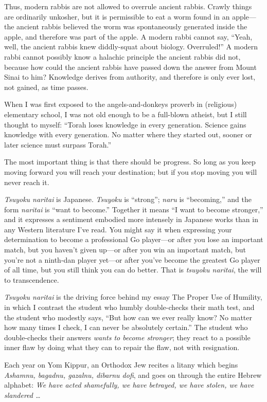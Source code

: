 {
 Thus, modern rabbis are not allowed to overrule ancient rabbis.
Crawly things are ordinarily unkosher, but it is permissible to eat a
worm found in an apple---the ancient rabbis believed the worm was
spontaneously generated inside the apple, and therefore was part of the
apple. A modern rabbi cannot say, ``Yeah, well, the
ancient rabbis knew diddly-squat about biology.
Overruled!'' A modern rabbi cannot possibly know a
halachic principle the ancient rabbis did not, because how could the
ancient rabbis have passed down the answer from Mount Sinai to him?
Knowledge derives from authority, and therefore is only ever lost, not
gained, as time passes.}

{
 When I was first exposed to the angels-and-donkeys proverb in
(religious) elementary school, I was not old enough to be a full-blown
atheist, but I still thought to myself: ``Torah loses
knowledge in every generation. Science gains knowledge with every
generation. No matter where they started out, sooner or later science
must surpass Torah.''}

{
 The most important thing is that there should be progress. So long
as you keep moving forward you will reach your destination; but if you
stop moving you will never reach it.}

{
 \textit{Tsuyoku naritai} is Japanese. \textit{Tsuyoku} is
``strong''; \textit{naru} is
``becoming,'' and the form
\textit{naritai} is ``want to
become.'' Together it means ``I want
to become stronger,'' and it expresses a sentiment
embodied more intensely in Japanese works than in any Western
literature I've read. You might say it when expressing
your determination to become a professional Go player---or after you
lose an important match, but you haven't given up---or
after you win an important match, but you're not a
ninth-dan player yet---or after you've become the
greatest Go player of all time, but you still think you can do better.
That is \textit{tsuyoku naritai}, the will to transcendence.}

{
 \textit{Tsuyoku naritai} is the driving force behind my essay The
Proper Use of Humility, in which I contrast the student who humbly
double-checks their math test, and the student who modestly says,
``But how can we ever really know? No matter how many
times I check, I can never be absolutely certain.''
The student who double-checks their answers \textit{wants to become
stronger}; they react to a possible inner flaw by doing what they can
to repair the flaw, not with resignation.}

{
 Each year on Yom Kippur, an Orthodox Jew recites a litany which
begins \textit{Ashamnu, bagadnu, gazalnu, dibarnu dofi}, and goes on
through the entire Hebrew alphabet: \textit{We have acted shamefully,
we have betrayed, we have stolen, we have slandered \ldots}}

